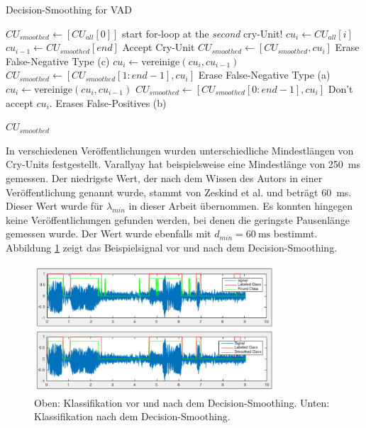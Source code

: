 \begin{algorithm}[h]
	\caption{Decision-Smoothing for VAD}
	\label{alg:decisionSmoothing}
	\begin{algorithmic}[1]
		\State $CU_{smoothed} \gets[CU_{all}[0]] $
		\State \Comment start for-loop at the \emph{second} cry-Unit!
			\State $cu_i \gets CU_{all}[i]$
			\State $cu_{i-1} \gets CU_{smoothed}[end]$
			\State \Comment Accept Cry-Unit
					\State $CU_{smoothed} \gets [CU_{smoothed}, cu_i] $
			\Else
					\State \Comment Erase False-Negative Type (c)
					\State $cu_i \gets \text{vereinige}(cu_i, cu_{i-1})$
					\State $CU_{smoothed} \gets [CU_{smoothed}[1:end-1], cu_i] $
			\EndIf
			\Else
			\State \Comment Erase False-Negative Type (a)
			\State $cu_i \gets \text{vereinige}(cu_i, cu_{i-1})$
			\State $CU_{smoothed} \gets [CU_{smoothed}[0:end-1], cu_i] $
			\Else
			\State \Comment Don't accept $cu_i$. Erases False-Positives (b)
			\EndIf
			\EndIf
		\EndFor
		
		\Return $CU_{smoothed}$
		\EndFunction
		
	\end{algorithmic}
\end{algorithm}

In verschiedenen Veröffentlichungen wurden unterschiedliche Mindestlängen von Cry-Units festgestellt. Varallyay \cite[S. 8]{cry_thesis} hat beispielsweise eine Mindestlänge von \SI{250}{\milli\second} gemessen. Der niedrigste Wert, der nach dem Wissen des Autors in einer Veröffentlichung genannt wurde, stammt von Zeskind et al. \cite[S. 325]{rythmic} und beträgt  \SI{60}{\milli\second}. Dieser Wert wurde für $\lambda_{min}$ in dieser Arbeit übernommen. Es konnten hingegen keine Veröffentlichungen gefunden werden, bei denen die geringste Pausenlänge gemessen wurde. Der Wert wurde ebenfalls mit $d_{min} = \SI{60}{\milli\second}$ bestimmt. Abbildung \ref{img:after-smoothing} zeigt das Beispielsignal vor und nach dem Decision-Smoothing. 

\begin{figure}[h]
	\centering
	\includegraphics[width=0.8\textwidth]{bilder/smoothing04.png}
	\caption{Oben: Klassifikation vor und nach dem Decision-Smoothing. Unten: Klassifikation nach dem Decision-Smoothing.}
	\label{img:after-smoothing}
\end{figure}

